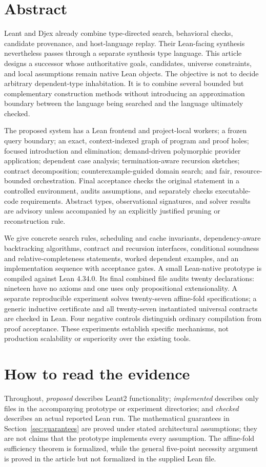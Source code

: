 \documentclass[11pt,letterpaper]{article}
\theoremstyle{definition}\newtheorem{definition}[theorem]{Definition}
\theoremstyle{remark}\newtheorem{remark}[theorem]{Remark}
\begin{document}
\section*{Abstract}
Leant and Djex already combine type-directed search, behavioral checks, candidate provenance, and host-language replay. Their Lean-facing synthesis nevertheless passes through a separate synthesis type language. This article designs a successor whose authoritative goals, candidates, universe constraints, and local assumptions remain native Lean objects. The objective is not to decide arbitrary dependent-type inhabitation. It is to combine several bounded but complementary construction methods without introducing an approximation boundary between the language being searched and the language ultimately checked.

The proposed system has a Lean frontend and project-local workers; a frozen query boundary; an exact, context-indexed graph of program and proof holes; focused introduction and elimination; demand-driven polymorphic provider application; dependent case analysis; termination-aware recursion sketches; contract decomposition; counterexample-guided domain search; and fair, resource-bounded orchestration. Final acceptance checks the original statement in a controlled environment, audits assumptions, and separately checks executable-code requirements. Abstract types, observational signatures, and solver results are advisory unless accompanied by an explicitly justified pruning or reconstruction rule.

We give concrete search rules, scheduling and cache invariants, dependency-aware backtracking algorithms, contract and recursion interfaces, conditional soundness and relative-completeness statements, worked dependent examples, and an implementation sequence with acceptance gates. A small Lean-native prototype is compiled against Lean 4.34.0. Its final combined file audits twenty declarations: nineteen have no axioms and one uses only propositional extensionality. A separate reproducible experiment solves twenty-seven affine-fold specifications; a generic inductive certificate and all twenty-seven instantiated universal contracts are checked in Lean. Four negative controls distinguish ordinary compilation from proof acceptance. These experiments establish specific mechanisms, not production scalability or superiority over the existing tools.

\section*{How to read the evidence}
Throughout, \emph{proposed} describes Leant2 functionality; \emph{implemented} describes only files in the accompanying prototype or experiment directories; and \emph{checked} describes an actual reported Lean run. The mathematical guarantees in Section~\ref{sec:guarantees} are proved under stated architectural assumptions; they are not claims that the prototype implements every assumption. The affine-fold sufficiency theorem is formalized, while the general five-point necessity argument is proved in the article but not formalized in the supplied Lean file.
\end{document}
